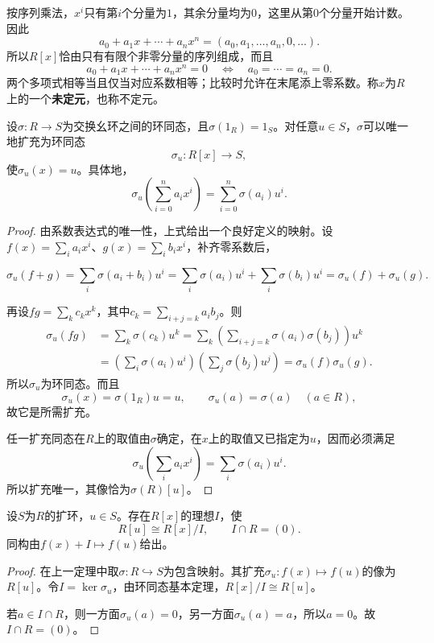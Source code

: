 按序列乘法，$x^i$只有第$i$个分量为$1$，其余分量均为$0$，这里从第$0$个分量开始计数。因此
\[
a_0+a_1x+\cdots+a_nx^n=(a_0,a_1,\ldots,a_n,0,\ldots).
\]
所以$R[x]$恰由只有有限个非零分量的序列组成，而且
\[
a_0+a_1x+\cdots+a_nx^n=0
\quad\Longleftrightarrow\quad a_0=\cdots=a_n=0.
\]
\label{p2:concept:c3-indeterminate}两个多项式相等当且仅当对应系数相等；比较时允许在末尾添上零系数。称$x$为$R$上的一个\textbf{未定元}，也称不定元。

\begin{theorem}\label{p2:poly-universal}
设$\sigma:R\to S$为交换幺环之间的环同态，且$\sigma(1_R)=1_S$。对任意$u\in S$，$\sigma$可以唯一地扩充为环同态
\[
\sigma_u:R[x]\to S,
\]
使$\sigma_u(x)=u$。具体地，
\[
\sigma_u\left(\sum_{i=0}^n a_i x^i\right)
=\sum_{i=0}^n\sigma(a_i)u^i.
\]
\end{theorem}
\begin{proof}
由系数表达式的唯一性，上式给出一个良好定义的映射。设$f(x)=\sum_i a_i x^i$、$g(x)=\sum_i b_i x^i$，补齐零系数后，

\[ \sigma_u(f+g)
=\sum_i\sigma(a_i+b_i)u^i
=\sum_i\sigma(a_i)u^i+\sum_i\sigma(b_i)u^i
=\sigma_u(f)+\sigma_u(g). \]

再设$fg=\sum_k c_kx^k$，其中$c_k=\sum_{i+j=k}a_i b_j$。则
\begin{align*}
\sigma_u(fg)
&=\sum_k\sigma(c_k)u^k=\sum_k\left(\sum_{i+j=k}\sigma(a_i)\sigma(b_j)\right)u^k\\
&=\left(\sum_i\sigma(a_i)u^i\right)
  \left(\sum_j\sigma(b_j)u^j\right)=\sigma_u(f)\sigma_u(g).
\end{align*}
所以$\sigma_u$为环同态。而且
\[
\sigma_u(x)=\sigma(1_R)u=u,\qquad
\sigma_u(a)=\sigma(a)\quad(a\in R),
\]
故它是所需扩充。

任一扩充同态在$R$上的取值由$\sigma$确定，在$x$上的取值又已指定为$u$，因而必须满足
\[
\sigma_u\left(\sum_i a_i x^i\right)=\sum_i\sigma(a_i)u^i.
\]
所以扩充唯一，其像恰为$\sigma(R)[u]$。
\end{proof}

\begin{corollary}
设$S$为$R$的扩环，$u\in S$。存在$R[x]$的理想$I$，使
\[
R[u]\cong R[x]/I,\qquad I\cap R=(0).
\]
同构由$f(x)+I\mapsto f(u)$给出。
\end{corollary}
\begin{proof}
在上一定理中取$\sigma:R\hookrightarrow S$为包含映射。其扩充$\sigma_u:f(x)\mapsto f(u)$的像为$R[u]$。令$I=\ker\sigma_u$，由环同态基本定理，$R[x]/I\cong R[u]$。

若$a\in I\cap R$，则一方面$\sigma_u(a)=0$，另一方面$\sigma_u(a)=a$，所以$a=0$。故$I\cap R=(0)$。
\end{proof}


